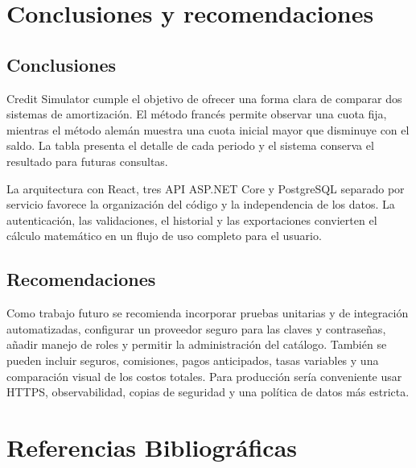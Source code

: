 \documentclass[12pt,a4paper]{article}
\begin{document}
\section{Conclusiones y recomendaciones}

\subsection{Conclusiones}

Credit Simulator cumple el objetivo de ofrecer una forma clara de comparar dos
sistemas de amortización. El método francés permite observar una cuota fija,
mientras el método alemán muestra una cuota inicial mayor que disminuye con el
saldo. La tabla presenta el detalle de cada periodo y el sistema conserva el
resultado para futuras consultas.

La arquitectura con React, tres API ASP.NET Core y PostgreSQL separado por
servicio favorece la organización del código y la independencia de los datos.
La autenticación, las validaciones, el historial y las exportaciones convierten
el cálculo matemático en un flujo de uso completo para el usuario.

\subsection{Recomendaciones}

Como trabajo futuro se recomienda incorporar pruebas unitarias y de integración
automatizadas, configurar un proveedor seguro para las claves y contraseñas,
añadir manejo de roles y permitir la administración del catálogo. También se
pueden incluir seguros, comisiones, pagos anticipados, tasas variables y una
comparación visual de los costos totales. Para producción sería conveniente
usar HTTPS, observabilidad, copias de seguridad y una política de datos más
estricta.

\section*{Referencias Bibliográficas}
\end{document}
